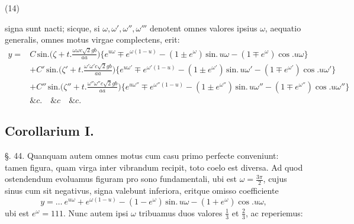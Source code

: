 \documentclass[11pt,a4paper]{article}
\begin{document}
(14\ill{})

signa sunt nacti; sicque, si $\omega, \omega', \omega'', \omega'''$ denotent omnes valores ipsius $\omega$,
aequatio generalis, omnes motus virgae complectens, erit:
\begin{align*}
y ={}& C\,\text{sin.}\Big(\zeta+t.\frac{\omega\omega c\surd 2gb}{aa}\Big)\big\{e^{u\omega}\mp e^{\omega(1-u)}-(1\pm e^{\omega})\,\text{sin.}\,u\omega-(1\mp e^{\omega})\cos.u\omega\big\} \\
&+ C'\,\text{sin.}\Big(\zeta'+t.\frac{\omega'\omega'c\surd 2gb}{aa}\Big)\big\{e^{u\omega'}\mp e^{\omega'(1-u)}-(1\pm e^{\omega'})\,\text{sin.}\,u\omega'-(1\mp e^{\omega'})\cos.u\omega'\big\} \\
&+ C''\,\text{sin.}\Big(\zeta''+t.\frac{\omega''\omega''c\surd 2gb}{aa}\Big)\big\{e^{u\omega''}\mp e^{\omega''(1-u)}-(1\pm e^{\omega''})\,\text{sin.}\,u\omega''-(1\mp e^{\omega''})\cos.u\omega''\big\} \\
&\&c.\quad \&c \quad \&c.
\end{align*}

\subsection{Corollarium I.}

§. 44. Quanquam autem omnes motus cum casu primo
perfecte conveniunt: tamen figura, quam virga inter
vibrandum recipit, toto coelo est diversa. Ad quod 
ostendendum evoluamus figuram pro sono fundamentali,
ubi est $\omega=\frac{3\pi}{2}$, cujus sinus cum sit negativus, signa valebunt
inferiora, eritque omisso coefficiente
\[ y=\ldots\ e^{u\omega}+e^{\omega(1-u)}-(1-e^{\omega})\,\text{sin.}\,u\omega-(1+e^{\omega})\cos.u\omega, \]
ubi est $e^{\omega}=111$. Nunc autem ipsi $\omega$ tribuamus duos valores
$\frac{1}{3}$ et $\frac{2}{3}$, ac reperiemus:
\end{document}

